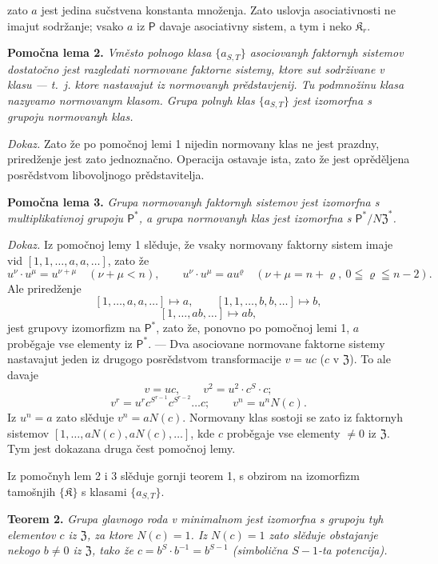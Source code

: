 \documentclass[11pt]{article}
\begin{document}
zato \(a\) jest jedina sučstvena konstanta množenja. Zato uslovja asociativnosti ne imajut sodržanje; vsako \(a\) iz \(\mathsf{P}\) davaje asociativny sistem, a tym i neko \(\mathfrak K_r\).

\noindent\textbf{Pomočna lema 2.} \emph{Vměsto polnogo klasa \(\{a_{S,T}\}\) asociovanyh faktornyh sistemov dostatočno jest razgledati normovane faktorne sistemy, ktore sut sodrživane v klasu --- t.~j. ktore nastavajut iz normovanyh prědstavjenij. Tu podmnožinu klasa nazyvamo normovanym klasom. Grupa polnyh klas \(\{a_{S,T}\}\) jest izomorfna s grupoju normovanyh klas.}

\noindent\emph{Dokaz.} Zato že po pomočnoj lemi 1 nijedin normovany klas ne jest prazdny, priredženje jest zato jednoznačno. Operacija ostavaje ista, zato že jest oprěděljena posrědstvom libovoljnogo prědstavitelja.

\noindent\textbf{Pomočna lema 3.} \emph{Grupa normovanyh faktornyh sistemov jest izomorfna s multiplikativnoj grupoju \(\mathsf{P}^*\), a grupa normovanyh klas jest izomorfna s \(\mathsf{P}^*/N\mathfrak Z^*\).}

\noindent\emph{Dokaz.} Iz pomočnoj lemy 1 slěduje, že vsaky normovany faktorny sistem imaje vid \([1,1,\ldots,a,a,\ldots]\), zato že
\[
u^\nu\cdot u^\mu=u^{\nu+\mu}\quad(\nu+\mu<n),
\qquad
u^\nu\cdot u^\mu=au^\varrho\quad(\nu+\mu=n+\varrho,\ 0\leqq\varrho\leqq n-2).
\]
Ale priredženje
\[
[1,\ldots,a,a,\ldots]\mapsto a,
\qquad
[1,1,\ldots,b,b,\ldots]\mapsto b,
\]
\[
[1,\ldots,ab,\ldots]\mapsto ab,
\]
jest grupovy izomorfizm na \(\mathsf{P}^*\), zato že, ponovno po pomočnoj lemi 1, \(a\) proběgaje vse elementy iz \(\mathsf{P}^*\). --- Dva asociovane normovane faktorne sistemy nastavajut jeden iz drugogo posrědstvom transformacije \(v=uc\) (\(c\) v \(\mathfrak Z\)). To ale davaje
\[
v=uc,\qquad v^2=u^2\cdot c^S\cdot c;
\]
\[
v^r=u^r c^{S^{r-1}}c^{S^{r-2}}\ldots c;
\qquad
v^n=u^nN(c).
\]
Iz \(u^n=a\) zato slěduje \(v^n=aN(c)\). Normovany klas sostoji se zato iz faktornyh sistemov \([1,\ldots,aN(c),aN(c),\ldots]\), kde \(c\) proběgaje vse elementy \(\neq0\) iz \(\mathfrak Z\). Tym jest dokazana druga čest pomočnoj lemy.

Iz pomočnyh lem 2 i 3 slěduje gornji teorem 1, s obzirom na izomorfizm tamošnjih \(\{\mathfrak K\}\) s klasami \(\{a_{S,T}\}\).

\noindent\textbf{Teorem 2.} \emph{Grupa glavnogo roda v minimalnom jest izomorfna s grupoju tyh elementov \(c\) iz \(\mathfrak Z\), za ktore \(N(c)=1\). Iz \(N(c)=1\) zato slěduje obstajanje nekogo \(b\neq0\) iz \(\mathfrak Z\), tako že \(c=b^S\cdot b^{-1}=b^{S-1}\) (simbolična \(S-1\)-ta potencija).}
\end{document}
